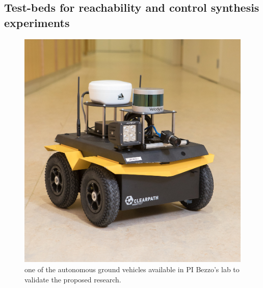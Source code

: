 
\subsection{Test-beds for reachability and control synthesis experiments}


\begin{figure}
\vspace{-5pt}
\centering
\includegraphics[width = \linewidth ]{figures/jackal_2.jpg} 
\caption{one of the autonomous ground vehicles available in PI Bezzo's lab to validate the proposed research.}
\vspace{-5pt}
\label{fig:jackal}\end{figure}

